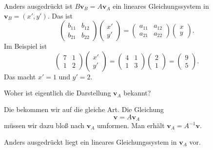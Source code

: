 \documentclass[9pt]{beamer}
\newcommand{\bv}[1]{\mathbf{#1}}
\newcommand{\parspace}{\vspace{0.8em}}
\newcommand{\basis}[1]{#1}
\begin{document}
\begin{frame}
Anders ausgedrückt ist $B\bv v_{\basis B} = A\bv v_{\basis A}$ ein lineares
Gleichungssystem in $\bv v_{\basis B}=(x',y')$.\pause{} Das ist
\[\begin{pmatrix}b_{11} & b_{12}\\ b_{21} & b_{22}\end{pmatrix}\begin{pmatrix}x'\\ y'\end{pmatrix}
= \begin{pmatrix}a_{11} & a_{12}\\ a_{21} & a_{22}\end{pmatrix}\begin{pmatrix}x\\ y\end{pmatrix}.
\]\pause{}
Im Beispiel ist
\[\begin{pmatrix}7 & 1\\ 1 & 2\end{pmatrix}\begin{pmatrix}x'\\ y'\end{pmatrix}
= \begin{pmatrix}4 & 1\\ 1 & 3\end{pmatrix}\begin{pmatrix}2\\ 1\end{pmatrix}
= \begin{pmatrix}9\\ 5\end{pmatrix}.\]\pause
Das macht $x'=1$ und $y'=2$.
\end{frame}

\begin{frame}
Woher ist eigentlich die Darstellung $\bv v_{\basis A}$ bekannt?\pause

\parspace
Die bekommen wir auf die gleiche Art.  Die Gleichung
\[\bv v = A\bv v_{\basis A}\]
müssen wir dazu bloß nach $\bv v_{\basis A}$ umformen. Man erhält
$\bv v_{\basis A} = A^{-1}\bv v$.\pause

\parspace
Anders ausgedrückt liegt ein lineares Gleichungssystem
in $\bv v_{\basis A}$ vor.
\end{frame}
\end{document}
